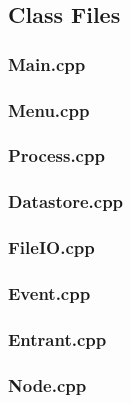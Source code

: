 \documentclass[a4paper, 10pt]{article}
\begin{document}
\clearpage
\subsection{Class Files}

\subsubsection{Main.cpp}


\clearpage
\subsubsection{Menu.cpp}


\clearpage
\subsubsection{Process.cpp}


\clearpage
\subsubsection{Datastore.cpp}


\clearpage
\subsubsection{FileIO.cpp}


\clearpage
\subsubsection{Event.cpp}


\clearpage
\subsubsection{Entrant.cpp}


\clearpage
\subsubsection{Node.cpp}

\end{document}
